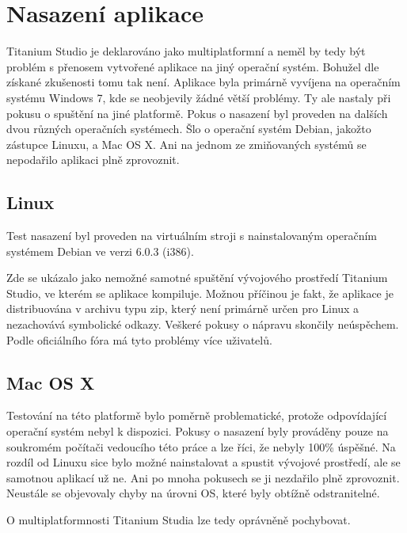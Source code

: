 \chapter{Nasazení aplikace}

Titanium Studio je deklarováno jako multiplatformní a neměl by tedy být problém s přenosem vytvořené aplikace na jiný operační systém. Bohužel dle získané zkušenosti tomu tak není. Aplikace byla primárně vyvíjena na operačním systému Windows 7, kde se neobjevily žádné větší problémy. Ty ale nastaly při pokusu o spuštění na jiné platformě. Pokus o nasazení byl proveden na dalších dvou různých operačních systémech. Šlo o operační systém Debian, jakožto zástupce Linuxu, a Mac OS X. Ani na jednom ze zmiňovaných systémů se nepodařilo aplikaci plně zprovoznit. 

\section{Linux}
Test nasazení byl proveden na virtuálním stroji s nainstalovaným operačním systémem Debian ve verzi 6.0.3 (i386).

Zde se ukázalo jako nemožné samotné spuštění vývojového prostředí Titanium Studio, ve kterém se aplikace kompiluje. Možnou příčinou je fakt, že aplikace je distribuována v archivu typu zip, který není primárně určen pro Linux a nezachovává symbolické odkazy. Veškeré pokusy o nápravu skončily neúspěchem. Podle oficiálního fóra má tyto problémy více uživatelů.

\section{Mac OS X}

Testování na této platformě bylo poměrně problematické, protože odpovídající operační systém nebyl k dispozici. Pokusy o nasazení byly prováděny pouze na soukromém počítači vedoucího této práce a lze říci, že nebyly 100\% úspěšné. Na rozdíl od Linuxu sice bylo možné nainstalovat a spustit vývojové prostředí, ale se samotnou aplikací už ne. Ani po mnoha pokusech se ji nezdařilo plně zprovoznit. Neustále se objevovaly chyby na úrovni OS, které byly obtížně odstranitelné.

O multiplatformnosti Titanium Studia lze tedy oprávněně pochybovat.